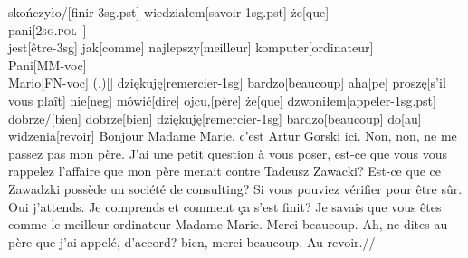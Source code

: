 \documentclass[12pt,a4paper,french]{book}
\newcommand{\pv}{\textsc{2sg.pol}}
\begin{document}
skończyło/[finir-{\sc 3sg.pst}] wiedziałem[savoir-{\sc 1sg.pst}]   że[que]
\\{pani}[\pv~] \\{jest}[être-{\sc 3sg}] jak[comme]
najlepszy[meilleur] komputer[ordinateur]   \\{Pani}[MM-{\sc voc}]
\\{Mario}[FN-{\sc voc}]   {(.)}[{}]   dziękuję[remercier-{\sc 1sg}]
bardzo[beaucoup]   aha[{\sc pe}]   proszę[{s'il vous plaît}]   nie[{\sc neg}]
mówić[dire]   ojcu,[père] że[que]   dzwoniłem[appeler-{\sc 1sg.pst}]
dobrze/[bien]   dobrze[bien] dziękuję[remercier-{\sc 1sg}] bardzo[beaucoup]
do[au]   widzenia[revoir]
%
\glft Bonjour Madame Marie, c'est Artur Gorski ici. Non, non, ne me passez pas
mon père. J'ai une petit question à vous poser, est-ce que vous vous rappelez
l'affaire que mon père menait contre Tadeusz Zawacki? Est-ce que ce Zawadzki
possède un société de consulting? Si vous pouviez vérifier pour être sûr.
Oui j'attends. Je comprends et comment ça s'est finit? Je savais que vous êtes
comme le meilleur ordinateur Madame Marie. Merci beaucoup. Ah, ne dites au père
que j'ai appelé, d'accord? bien, merci beaucoup. Au revoir.//
\endgl
\xe
\end{document}
